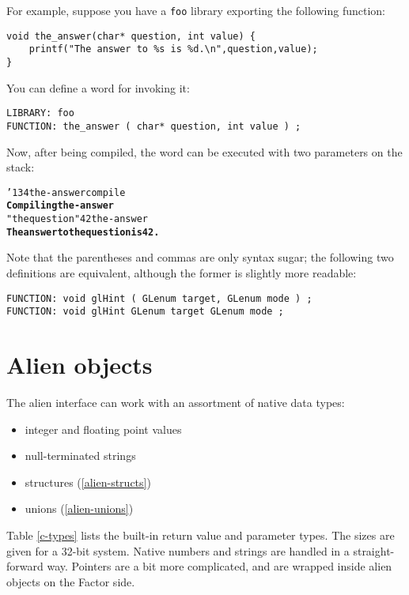 \documentclass{book}
\newcommand{\bs}{\char'134}
\begin{document}
For example, suppose you have a \verb|foo| library exporting the following function:
\begin{verbatim}
void the_answer(char* question, int value) {
    printf("The answer to %s is %d.\n",question,value);
}
\end{verbatim}
You can define a word for invoking it:
\begin{verbatim}
LIBRARY: foo
FUNCTION: the_answer ( char* question, int value ) ;
\end{verbatim}
Now, after being compiled, the word can be executed with two parameters on the stack:
\begin{alltt}
  \bs the-answer compile
\textbf{Compiling the-answer}
  "the question" 42 the-answer
\textbf{The answer to the question is 42.}
\end{alltt}

Note that the parentheses and commas are only syntax sugar; the following two definitions are equivalent, although the former is slightly more readable:
\begin{verbatim}
FUNCTION: void glHint ( GLenum target, GLenum mode ) ;
FUNCTION: void glHint GLenum target GLenum mode ;
\end{verbatim}

\section{Alien objects}\label{aliens}

The alien interface can work with an assortment of native data types:
\begin{itemize}
\item integer and floating point values
\item null-terminated strings
\item structures (\ref{alien-structs})
\item unions (\ref{alien-unions})
\end{itemize}
Table \ref{c-types} lists the built-in return value and parameter types. The sizes are given for a 32-bit system. Native numbers and strings are handled in a straight-forward way. Pointers are a bit more complicated, and are wrapped inside alien objects on the Factor side.
\end{document}
